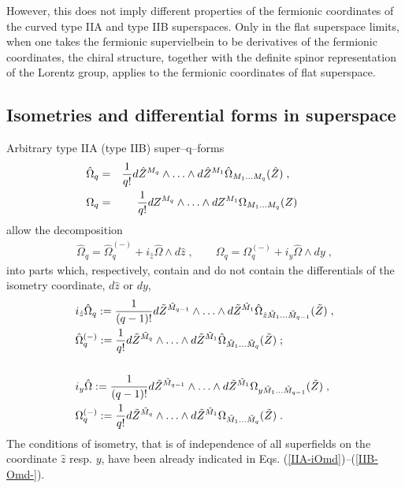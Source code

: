 \documentclass[a4paper,11pt]{article}
\begin{document}
However, this does not imply 
different properties of the fermionic coordinates of the curved type IIA and 
type IIB superspaces.  
Only in the flat superspace limits, when one takes the fermionic 
supervielbein to be  derivatives of the fermionic coordinates, 
the chiral structure, together  
with the definite spinor representation of the Lorentz group,   
applies to the fermionic coordinates of flat superspace. 
 

\subsection{Isometries and differential forms in superspace}

Arbitrary type IIA (type IIB) super--q--forms  
\begin{eqnarray}\label{IIA-Om}
\hat{\Omega}_q &=& {1\over q!} d\hat{Z}^{M_q} \wedge \ldots \wedge 
d\hat{Z}^{M_1} 
\hat{\Omega}_{M_1\ldots M_q}(\hat{Z}) \; , \quad 
\qquad  \nonumber \\ 
 \Omega_q &=& {1\over q!} dZ^{M_q} \wedge \ldots \wedge dZ^{M_1} 
\Omega_{M_1\ldots M_q}(Z) \; \qquad 
\end{eqnarray}
allow the decomposition 
\begin{eqnarray}\label{IIA-Omd} 
\hat{\Omega}_q = \hat{\Omega}^{(-)}_q + i_{\hat{z}}\hat{\Omega}\wedge d\hat{z} 
\; ,  \qquad 
 {\Omega}_q = {\Omega}^{(-)}_q + i_{y}\hat{\Omega}\wedge dy 
\; , 
\end{eqnarray}
into parts which, respectively, 
contain and do not contain the differentials of the isometry 
coordinate, $d\hat{z}$ or $dy$,  
\begin{eqnarray}\label{IIA-iOmd} 
& i_{\hat{z}}\hat{\Omega}_q := {1\over (q-1)!} d\tilde{Z}^{\tilde{M}_{q-1}} 
\wedge \ldots \wedge 
d\tilde{Z}^{\tilde{M}_1} 
\hat{\Omega}_{\hat{z} \tilde{M}_1\ldots \tilde{M}_{q-1}}(\tilde{Z}) 
\; , 
\\ 
\label{IIA-Omd-}
& \hat{\Omega}^{(-)}_q := {1\over q!} d\tilde{Z}^{\tilde{M}_{q}} 
\wedge \ldots \wedge 
d\tilde{Z}^{\tilde{M}_1} 
\hat{\Omega}_{\tilde{M}_1\ldots \tilde{M}_{q}}(\tilde{Z}) 
\; ;  \\ \nonumber \\  
\label{IIB-iOmd}
& i_{y}\hat{\Omega}:=
{1\over (q-1)!} d\tilde{Z}^{\tilde{M}_{q-1}} 
\wedge \ldots \wedge 
d\tilde{Z}^{\tilde{M}_1} 
\Omega_{y\tilde{M}_1\ldots \tilde{M}_{q-1}}(\tilde{Z}) 
\; , \\  
\label{IIB-Omd-}
& {\Omega}^{(-)}_q:=
{1\over q!} d\tilde{Z}^{\tilde{M}_{q}} 
\wedge \ldots \wedge 
d\tilde{Z}^{\tilde{M}_1} 
\Omega_{\tilde{M}_1\ldots \tilde{M}_{q}}(\tilde{Z}) 
\; .
\end{eqnarray}
The conditions of isometry, that is of 
independence of all superfields on the coordinate $\hat{z}$ resp.  $y$, 
have been already indicated in Eqs. (\ref{IIA-iOmd})--(\ref{IIB-Omd-}).
\end{document}
